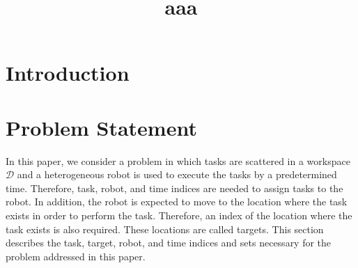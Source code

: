 \documentclass[]{interact}
\theoremstyle{plain}%
\theoremstyle{definition}
\theoremstyle{remark}
\begin{document}

\title{aaa}

\author{
}

\maketitle

\begin{abstract}

\end{abstract}

\begin{keywords}
\end{keywords}


\section{Introduction}

\section{Problem Statement}

In this paper, we consider a problem in which tasks are scattered in a workspace $\mathcal{D}$ and a heterogeneous robot is used to execute the tasks by a predetermined time.
Therefore, task, robot, and time indices are needed to assign tasks to the robot.
In addition, the robot is expected to move to the location where the task exists in order to perform the task. 
Therefore, an index of the location where the task exists is also required. These locations are called targets.
This section describes the task, target, robot, and time indices and sets necessary for the problem addressed in this paper.
\end{document}
